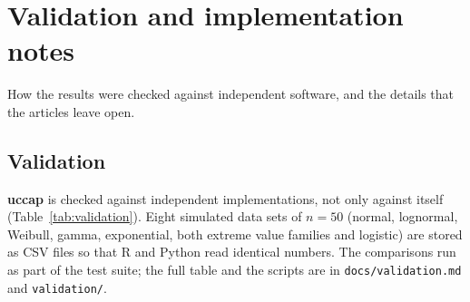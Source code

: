 \documentclass[a4paper,11pt,oneside,openany,parskip=half-,headings=standardclasses,toc=flat,numbers=noenddot]{scrbook}
\newcommand{\code}[1]{\texttt{\begingroup\def\_{\textunderscore\allowbreak}#1\endgroup}}
\newcommand{\pkg}{\textsf{\bfseries uccap}}
\newenvironment{chapterintro}{\begingroup\sffamily\small\color{muted}\noindent\ignorespaces}{\par\endgroup\medskip}
\newcommand{\tabref}[1]{Table~\ref{#1}}
\begin{document}
\chapter{Validation and implementation notes}\label{ch:validation}

\begin{chapterintro}
How the results were checked against independent software, and the details that the articles leave open.
\end{chapterintro}

\section{Validation}

\pkg{} is checked against independent implementations, not only against itself
(\tabref{tab:validation}). Eight simulated data sets of $n = 50$ (normal, lognormal, Weibull, gamma,
exponential, both extreme value families and logistic) are stored as CSV files so that R and Python read identical
numbers. The comparisons run as part of the test suite; the full table and the scripts are in
\code{docs/validation.md} and \code{validation/}.
\end{document}
